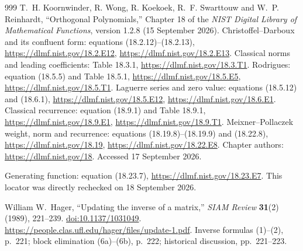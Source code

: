 \begin{thebibliography}{999}
T.~H. Koornwinder, R. Wong, R. Koekoek, R.~F. Swarttouw and
W.~P. Reinhardt,
``Orthogonal Polynomials,'' Chapter 18 of the
\emph{NIST Digital Library of Mathematical Functions},
version 1.2.8 (15 September 2026).
Christoffel--Darboux and its confluent form: equations (18.2.12)--(18.2.13),
\url{https://dlmf.nist.gov/18.2.E12},
\url{https://dlmf.nist.gov/18.2.E13}.
Classical norms and leading coefficients: Table 18.3.1,
\url{https://dlmf.nist.gov/18.3.T1}.
Rodrigues: equation (18.5.5) and Table 18.5.1,
\url{https://dlmf.nist.gov/18.5.E5},
\url{https://dlmf.nist.gov/18.5.T1}.
Laguerre series and zero value: equations (18.5.12) and (18.6.1),
\url{https://dlmf.nist.gov/18.5.E12},
\url{https://dlmf.nist.gov/18.6.E1}.
Classical recurrence: equation (18.9.1) and Table 18.9.1,
\url{https://dlmf.nist.gov/18.9.E1},
\url{https://dlmf.nist.gov/18.9.T1}.
Meixner--Pollaczek weight, norm and recurrence:
equations (18.19.8)--(18.19.9) and (18.22.8),
\url{https://dlmf.nist.gov/18.19},
\url{https://dlmf.nist.gov/18.22.E8}.
Chapter authors: \url{https://dlmf.nist.gov/18}.
Accessed 17 September 2026.


Generating function: equation (18.23.7),
\url{https://dlmf.nist.gov/18.23.E7}.
This locator was directly rechecked on 18 September 2026.


William W.~Hager, ``Updating the inverse of a matrix,''
\emph{SIAM Review} \textbf{31}(2) (1989), 221--239.
\href{https://doi.org/10.1137/1031049}{doi:10.1137/1031049}.
\url{https://people.clas.ufl.edu/hager/files/update-1.pdf}.
Inverse formulas (1)--(2), p.~221; block elimination (6a)--(6b),
p.~222; historical discussion, pp.~221--223.


\end{thebibliography}
